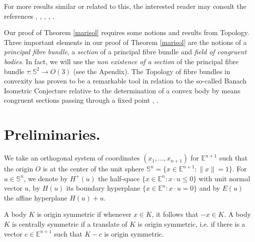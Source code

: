 \documentclass[12pt]{amsart}
\newcommand{\R}{\mathbb{R}}
\newcommand{\Rt}{\mathbb{R}^3}
\begin{document}
For more results similar or related to this, the interested reader may consult the re\-fe\-ren\-ces \cite{bg}, \cite{IJED1}, \cite{IJED2}, \cite{banda2}, \cite{mackey}.

Our proof of Theorem \ref{marisol} requires some notions and results from Topology. Three important elements in our proof of Theorem \ref{marisol} are the notions of a \textit{principal fibre bundle}, a \textit{section} of a principal fibre bundle and \textit{field of congruent bodies}. In fact, we will use the \textit{non existence of a section} of the principal fibre bundle $\tau: \mathbb{S}^2 \rightarrow O(3)$ (see the Apendix). The Topology of fibre bundles in convexity has proven to be a remarkable tool in relation to the so-called Banach Isometric Conjecture relative to the determination of  a convex body by means congruent sections passing through a fixed point \cite{mani}, \cite{monte}. 
\section{Preliminaries.} 
We take an orthogonal system of coordinates $(x_1,...,x_{n+1} )$ for  $\mathbb{E}^{n+1}$ such that the origin $O$ is at the center of the unit sphere 
$\mathbb{S}^{n}=\{x\in \mathbb{E}^{n+1}: \|x\| = 1\}$. For $u\in \mathbb{S}^{n}$, we denote by $H^ {+}(u)$  the half-space $\{x \in \mathbb{E} ^{n}: x\cdot u \leq 0\}$ with unit normal vector $u$, by $H(u)$ its boundary hyperplane $\{x \in \mathbb{E} ^{n}: x\cdot u = 0\}$ and by $E(u)$ the affine hyperplane $H(u)+u$. 

 





A body $K$ is origin symmetric if whenever $x \in K$, it follows that $-x \in K$. A body $K$ is centrally symmetric if a translate of $K$ is origin symmetric, i.e. if there is a vector $c \in \mathbb{E}^{n+1}$ such that $K-c$ is origin symmetric. 
\end{document}
